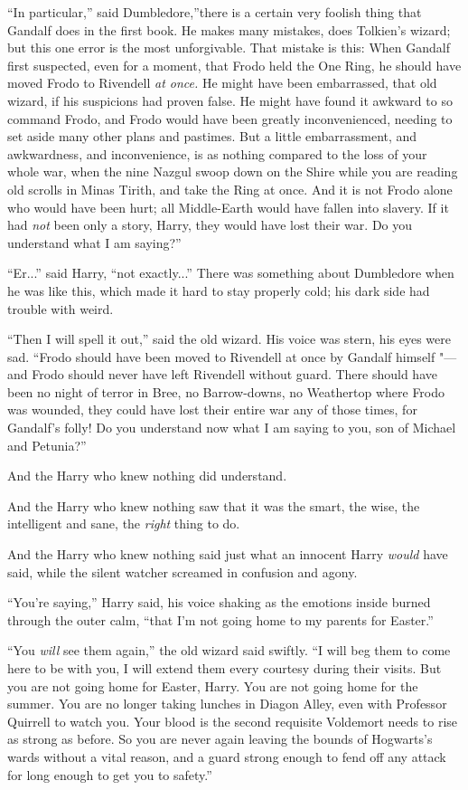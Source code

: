 ``In particular,'' said Dumbledore,''there is a certain very foolish
thing that Gandalf does in the first book. He makes many mistakes, does
Tolkien's wizard; but this one error is the most unforgivable. That
mistake is this: When Gandalf first suspected, even for a moment, that
Frodo held the One Ring, he should have moved Frodo to Rivendell
\emph{at once.} He might have been embarrassed, that old wizard, if his
suspicions had proven false. He might have found it awkward to so
command Frodo, and Frodo would have been greatly inconvenienced, needing
to set aside many other plans and pastimes. But a little embarrassment,
and awkwardness, and inconvenience, is as nothing compared to the loss
of your whole war, when the nine Nazgul swoop down on the Shire while
you are reading old scrolls in Minas Tirith, and take the Ring at once.
And it is not Frodo alone who would have been hurt; all Middle-Earth
would have fallen into slavery. If it had \emph{not} been only a story,
Harry, they would have lost their war. Do you understand what I am
saying?''

``Er...'' said Harry, ``not exactly...'' There was something
about Dumbledore when he was like this, which made it hard to stay
properly cold; his dark side had trouble with weird.

``Then I will spell it out,'' said the old wizard. His voice was stern,
his eyes were sad. ``Frodo should have been moved to Rivendell at once
by Gandalf himself "--- and Frodo should never have left Rivendell without
guard. There should have been no night of terror in Bree, no
Barrow-downs, no Weathertop where Frodo was wounded, they could have
lost their entire war any of those times, for Gandalf's folly! Do you
understand now what I am saying to you, son of Michael and Petunia?''

And the Harry who knew nothing did understand.

And the Harry who knew nothing saw that it was the smart, the wise, the
intelligent and sane, the \emph{right} thing to do.

And the Harry who knew nothing said just what an innocent Harry
\emph{would} have said, while the silent watcher screamed in confusion
and agony.

``You're saying,'' Harry said, his voice shaking as the emotions inside
burned through the outer calm, ``that I'm not going home to my parents
for Easter.''

``You \emph{will} see them again,'' the old wizard said swiftly. ``I will
beg them to come here to be with you, I will extend them every courtesy
during their visits. But you are not going home for Easter, Harry. You
are not going home for the summer. You are no longer taking lunches in
Diagon Alley, even with Professor Quirrell to watch you. Your blood is
the second requisite Voldemort needs to rise as strong as before. So you
are never again leaving the bounds of Hogwarts's wards without a vital
reason, and a guard strong enough to fend off any attack for long enough
to get you to safety.''

